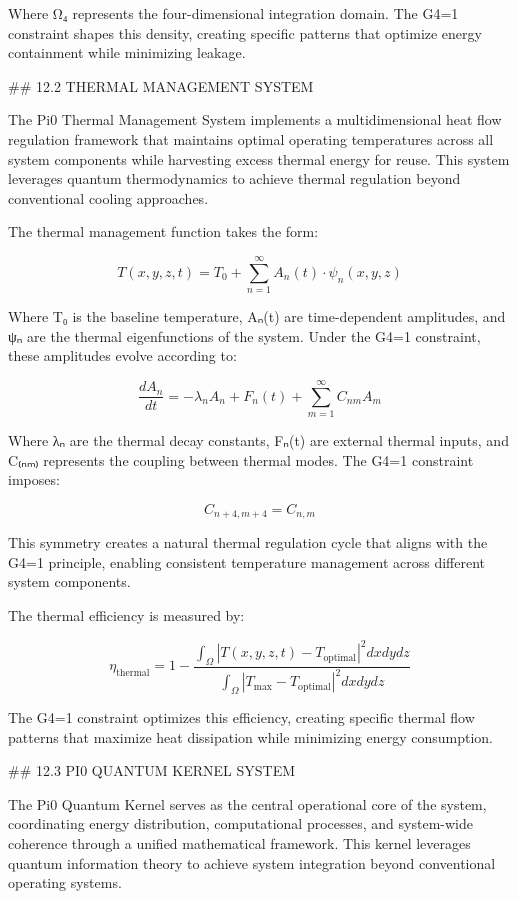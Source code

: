 Where Ω₄ represents the four-dimensional integration domain. The G4=1 constraint shapes this density, creating specific patterns that optimize energy containment while minimizing leakage.

## 12.2 THERMAL MANAGEMENT SYSTEM

The Pi0 Thermal Management System implements a multidimensional heat flow regulation framework that maintains optimal operating temperatures across all system components while harvesting excess thermal energy for reuse. This system leverages quantum thermodynamics to achieve thermal regulation beyond conventional cooling approaches.

The thermal management function takes the form:

$$T(x, y, z, t) = T_0 + \sum_{n=1}^{\infty} A_n(t) \cdot \psi_n(x, y, z)$$

Where T₀ is the baseline temperature, Aₙ(t) are time-dependent amplitudes, and ψₙ are the thermal eigenfunctions of the system. Under the G4=1 constraint, these amplitudes evolve according to:

$$\frac{dA_n}{dt} = -\lambda_n A_n + F_n(t) + \sum_{m=1}^{\infty} C_{nm} A_m$$

Where λₙ are the thermal decay constants, Fₙ(t) are external thermal inputs, and C₍ₙₘ₎ represents the coupling between thermal modes. The G4=1 constraint imposes:

$$C_{n+4,m+4} = C_{n,m}$$

This symmetry creates a natural thermal regulation cycle that aligns with the G4=1 principle, enabling consistent temperature management across different system components.

The thermal efficiency is measured by:

$$\eta_{\text{thermal}} = 1 - \frac{\int_{\Omega} |T(x,y,z,t) - T_{\text{optimal}}|^2 dx dy dz}{\int_{\Omega} |T_{\text{max}} - T_{\text{optimal}}|^2 dx dy dz}$$

The G4=1 constraint optimizes this efficiency, creating specific thermal flow patterns that maximize heat dissipation while minimizing energy consumption.

## 12.3 PI0 QUANTUM KERNEL SYSTEM

The Pi0 Quantum Kernel serves as the central operational core of the system, coordinating energy distribution, computational processes, and system-wide coherence through a unified mathematical framework. This kernel leverages quantum information theory to achieve system integration beyond conventional operating systems.

